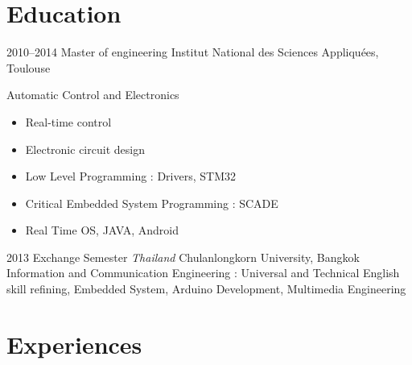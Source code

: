 \documentclass[a4paper]{friggeri-cv} %
\begin{document}
\section{Education}

\begin{entrylist}

\entry
{2010--2014}
{Master of engineering}
{Institut National des Sciences Appliquées, Toulouse}
{Automatic Control and Electronics
\begin{itemize}
\item Real-time control 
\item Electronic circuit design
\item Low Level Programming : Drivers, STM32
\item Critical Embedded System Programming : SCADE
\item Real Time OS, JAVA, Android
\end{itemize}}


\entry
{2013}
{Exchange Semester \textit{Thailand}}
{Chulanlongkorn University, Bangkok}
{Information and Communication Engineering : 
Universal and Technical English skill refining, Embedded System, Arduino Development, Multimedia Engineering}



\end{entrylist}


\section{Experiences}
\end{document}
